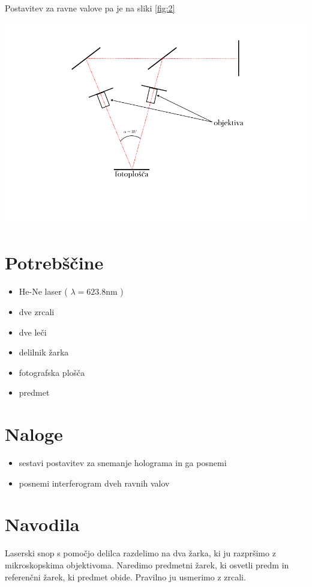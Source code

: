 \documentclass[11pt]{article}
\begin{document}
Postavitev za ravne valove pa je na sliki \ref{fig:2}

\begin{center}\label{fig:2}
\includegraphics[width=.9\linewidth]{ravni_zarek.pdf}
\end{center}
\section{Potrebščine}
\label{sec:orgc1ffef0}

\begin{itemize}
\item He-Ne laser ( \(\lambda = 623.8 \mathrm{nm}\) )
\item dve zrcali
\item dve leči
\item delilnik žarka
\item fotografska plošča
\item predmet
\end{itemize}
\section{Naloge}
\label{sec:org93ee1e7}
\begin{itemize}
\item sestavi postavitev za snemanje holograma in ga posnemi
\item posnemi interferogram dveh ravnih valov
\end{itemize}
\section{Navodila}
\label{sec:org9ab1b67}

Laserski snop s pomočjo delilca razdelimo na dva žarka, ki ju razpršimo z mikroskopskima objektivoma. Naredimo predmetni žarek, ki osvetli predm in referenčni žarek, ki predmet obide. Pravilno ju usmerimo z zrcali.
\end{document}
